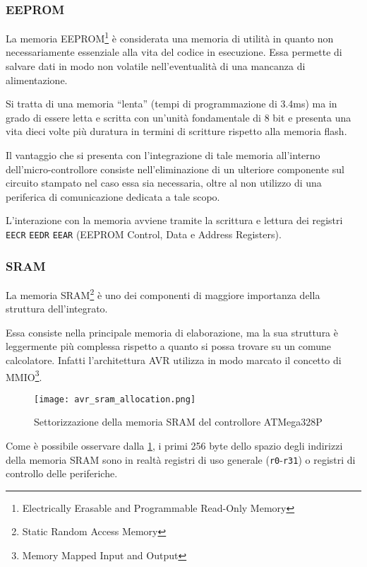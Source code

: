 \subsubsection{EEPROM}

La memoria EEPROM\footnote{Electrically Erasable and Programmable Read-Only Memory} è considerata una memoria di utilità in quanto non necessariamente essenziale alla vita del codice in esecuzione. Essa permette di salvare dati in modo non volatile nell'eventualità di una mancanza di alimentazione.

Si tratta di una memoria ``lenta'' (tempi di programmazione di 3.4ms\cite[tab 8-1]{avr:m328p}) ma in grado di essere letta e scritta con un'unità fondamentale di 8 bit\cite[sec 8.4]{avr:m328p} e presenta una vita dieci volte più duratura in termini di scritture rispetto alla memoria flash.

Il vantaggio che si presenta con l'integrazione di tale memoria all'interno dell'micro-controllore consiste nell'eliminazione di un ulteriore componente sul circuito stampato nel caso essa sia necessaria, oltre al non utilizzo di una periferica di comunicazione dedicata a tale scopo.

L'interazione con la memoria avviene tramite la scrittura e lettura dei registri \texttt{EECR} \texttt{EEDR} \texttt{EEAR} (EEPROM Control, Data e Address Registers)\cite[34]{avr:m328p}.

\subsubsection{SRAM}
La memoria SRAM\footnote{Static Random Access Memory} è uno dei componenti di maggiore importanza della struttura dell'integrato.

Essa consiste nella principale memoria di elaborazione, ma la sua struttura è leggermente più complessa rispetto a quanto si possa trovare su un comune calcolatore.
Infatti l'architettura AVR utilizza in modo marcato il concetto di MMIO\footnote{Memory Mapped Input and Output}.

\begin{figure}[b]
    \centering
    \texttt{[image: avr\_sram\_allocation.png]}
    \caption[Immagine ottenuta dal documento~\cite{avr:m328p}, fig. 8-3]{Settorizzazione della memoria SRAM del controllore ATMega328P\cite[fig 8-3]{avr:m328p}}\label{fig:avr-sram-alloc}
\end{figure}

Come è possibile osservare dalla \cref{fig:avr-sram-alloc}, i primi 256 byte dello spazio degli indirizzi della memoria SRAM sono in realtà registri di uso generale (\texttt{r0}-\texttt{r31}) o registri di controllo delle periferiche.

